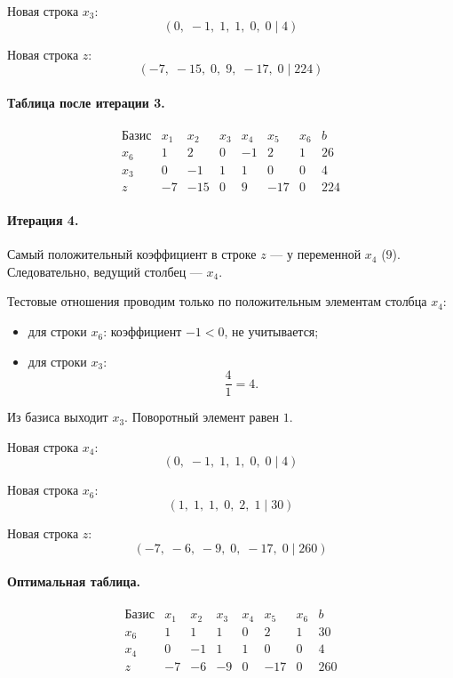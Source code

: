 \documentclass[a4paper,14pt]{extarticle}
\begin{document}
Новая строка \(x_3\):
\[
(0,\;-1,\;1,\;1,\;0,\;0\mid 4)
\]

Новая строка \(z\):
\[
(-7,\;-15,\;0,\;9,\;-17,\;0\mid 224)
\]

\paragraph{Таблица после итерации 3.}

\[
\begin{array}{c|rrrrrr|r}
\text{Базис} & x_1 & x_2 & x_3 & x_4 & x_5 & x_6 & b\\
\hline
x_6 & 1 & 2 & 0 & -1 & 2 & 1 & 26\\
x_3 & 0 & -1 & 1 & 1 & 0 & 0 & 4\\
z & -7 & -15 & 0 & 9 & -17 & 0 & 224
\end{array}
\]

\paragraph{Итерация 4.}
Самый положительный коэффициент в строке \(z\) — у переменной \(x_4\) (\(9\)). Следовательно, ведущий столбец — \(x_4\).

Тестовые отношения проводим только по положительным элементам столбца \(x_4\):
\begin{itemize}
    \item для строки \(x_6\): коэффициент \(-1<0\), не учитывается;
    \item для строки \(x_3\):
    \[
    \frac{4}{1}=4.
    \]
\end{itemize}

Из базиса выходит \(x_3\). Поворотный элемент равен \(1\).

Новая строка \(x_4\):
\[
(0,\;-1,\;1,\;1,\;0,\;0\mid 4)
\]

Новая строка \(x_6\):
\[
(1,\;1,\;1,\;0,\;2,\;1\mid 30)
\]

Новая строка \(z\):
\[
(-7,\;-6,\;-9,\;0,\;-17,\;0\mid 260)
\]

\paragraph{Оптимальная таблица.}

\[
\begin{array}{c|rrrrrr|r}
\text{Базис} & x_1 & x_2 & x_3 & x_4 & x_5 & x_6 & b\\
\hline
x_6 & 1 & 1 & 1 & 0 & 2 & 1 & 30\\
x_4 & 0 & -1 & 1 & 1 & 0 & 0 & 4\\
z & -7 & -6 & -9 & 0 & -17 & 0 & 260
\end{array}
\]
\end{document}
